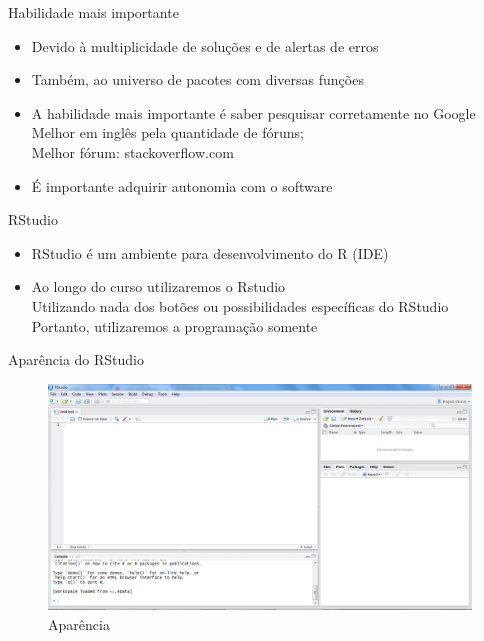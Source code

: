 \documentclass[
  10pt,
  ignorenonframetext,
]{beamer}
\providecommand{\tightlist}{%
  \setlength{\itemsep}{0pt}\setlength{\parskip}{0pt}}
\begin{document}
\begin{frame}{Habilidade mais importante}
\protect\hypertarget{habilidade-mais-importante}{}
\begin{itemize}
\tightlist
\item
  Devido à multiplicidade de soluções e de alertas de erros
\item
  Também, ao universo de pacotes com diversas funções
\item
  A habilidade mais importante é saber pesquisar corretamente no
  Google\\
  Melhor em inglês pela quantidade de fóruns;\\
  Melhor fórum: stackoverflow.com
\item
  É importante adquirir autonomia com o software
\end{itemize}
\end{frame}

\begin{frame}{RStudio}
\protect\hypertarget{rstudio}{}
\begin{itemize}
\tightlist
\item
  RStudio é um ambiente para desenvolvimento do R (IDE)
\item
  Ao longo do curso utilizaremos o Rstudio\\
  Utilizando nada dos botões ou possibilidades específicas do RStudio\\
  Portanto, utilizaremos a programação somente
\end{itemize}
\end{frame}

\begin{frame}{Aparência do RStudio}
\protect\hypertarget{aparuxeancia-do-rstudio}{}
\begin{figure}
\centering
\includegraphics{imgs/1.png}
\caption{Aparência}
\end{figure}
\end{frame}
\end{document}
